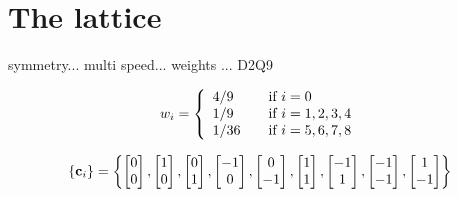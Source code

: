 \section{The lattice}\label{sec:lbm:lattice}
symmetry... multi speed... weights ... D2Q9

\begin{equation}\label{eq:lbm:weights}
w_i = 
\left\{
  \begin{array}{l l}
    4/9 & \quad \text{if $i = 0$}\\ 
    1/9 & \quad \text{if $i = 1,2,3,4$}\\    
    1/36 & \quad \text{if $i = 5,6,7,8$}\\
  \end{array} \right.
\end{equation}

\begin{equation}\label{eq:lbm:d2q9_c}
\{\mathbf{c}_i\} = \left\{
\begin{bmatrix}0\\0\end{bmatrix}, 
\begin{bmatrix}1\\0\end{bmatrix}, 
\begin{bmatrix}0\\1\end{bmatrix}, 
\begin{bmatrix}-1\\0\end{bmatrix}, 
\begin{bmatrix}0\\-1\end{bmatrix}, 
\begin{bmatrix}1\\1\end{bmatrix}, 
\begin{bmatrix}-1\\1\end{bmatrix}, 
\begin{bmatrix}-1\\-1\end{bmatrix}, 
\begin{bmatrix}1\\-1\end{bmatrix}
\right\} 
\end{equation}


